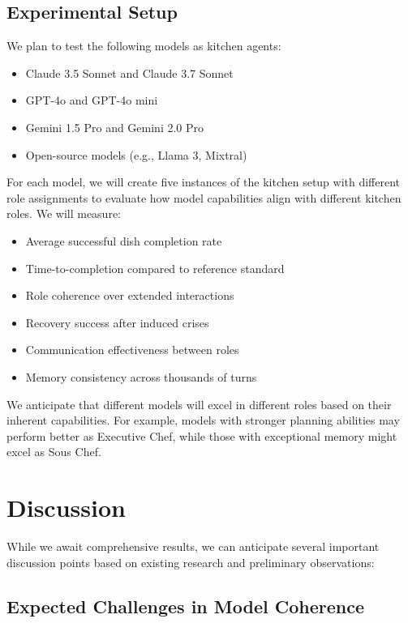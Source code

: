 \documentclass{article}
\begin{document}
\subsection{Experimental Setup}

We plan to test the following models as kitchen agents:

\begin{itemize}
    \item Claude 3.5 Sonnet and Claude 3.7 Sonnet
    \item GPT-4o and GPT-4o mini
    \item Gemini 1.5 Pro and Gemini 2.0 Pro
    \item Open-source models (e.g., Llama 3, Mixtral)
\end{itemize}

For each model, we will create five instances of the kitchen setup with different role assignments to evaluate how model capabilities align with different kitchen roles. We will measure:

\begin{itemize}
    \item Average successful dish completion rate
    \item Time-to-completion compared to reference standard
    \item Role coherence over extended interactions
    \item Recovery success after induced crises
    \item Communication effectiveness between roles
    \item Memory consistency across thousands of turns
\end{itemize}

We anticipate that different models will excel in different roles based on their inherent capabilities. For example, models with stronger planning abilities may perform better as Executive Chef, while those with exceptional memory might excel as Sous Chef.

\section{Discussion}
\label{sec:discussion}

While we await comprehensive results, we can anticipate several important discussion points based on existing research and preliminary observations:

\subsection{Expected Challenges in Model Coherence}
\end{document}
